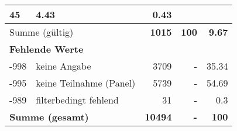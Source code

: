\begin{longtable}{lXrrr}
       \num{45} &
       \num[round-mode=places,round-precision=2]{4.43} &
         \num[round-mode=places,round-precision=2]{0.43} \\
     \midrule
     \multicolumn{2}{l}{Summe (gültig)} &
       \textbf{\num{1015}} &
     \textbf{\num{100}} &
       \textbf{\num[round-mode=places,round-precision=2]{9.67}} \\
     \multicolumn{5}{l}{\textbf{Fehlende Werte}}\\
       -998 &
       keine Angabe &
         \num{3709} &
        - &
         \num[round-mode=places,round-precision=2]{35.34} \\
       -995 &
       keine Teilnahme (Panel) &
         \num{5739} &
        - &
         \num[round-mode=places,round-precision=2]{54.69} \\
       -989 &
       filterbedingt fehlend &
         \num{31} &
        - &
         \num[round-mode=places,round-precision=2]{0.3} \\
     \midrule
     \multicolumn{2}{l}{\textbf{Summe (gesamt)}} &
          \textbf{\num{10494}} &
        \textbf{-} &
        \textbf{\num{100}} \\
     \bottomrule
     \end{longtable}
     
